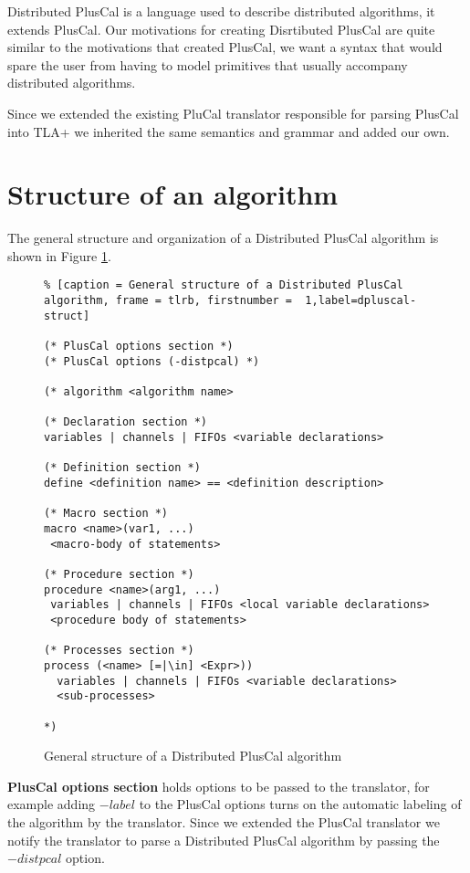 \documentclass{thesul}
\begin{document}
Distributed PlusCal is a language used to describe distributed algorithms, it extends PlusCal. 
Our motivations for creating Disrtibuted PlusCal are quite similar to the motivations that created PlusCal, we want a syntax that would spare the user from having to model primitives that usually accompany distributed algorithms.

Since we extended the existing PluCal translator responsible for parsing PlusCal into TLA+ we inherited the same semantics and grammar and added our own.

\section{Structure of an algorithm}

The general structure and organization of a Distributed PlusCal algorithm is shown in Figure \ref{dpluscal-struct}.

\FloatBarrier
\begin{figure}
\begin{lstlisting}% [caption = General structure of a Distributed PlusCal algorithm, frame = tlrb, firstnumber =  1,label=dpluscal-struct]

(* PlusCal options section *)
(* PlusCal options (-distpcal) *)

(* algorithm <algorithm name>

(* Declaration section *)
variables | channels | FIFOs <variable declarations>

(* Definition section *)
define <definition name> == <definition description>

(* Macro section *)
macro <name>(var1, ...)
 <macro-body of statements>

(* Procedure section *)
procedure <name>(arg1, ...)
 variables | channels | FIFOs <local variable declarations>
 <procedure body of statements>

(* Processes section *)
process (<name> [=|\in] <Expr>))
  variables | channels | FIFOs <variable declarations>
  <sub-processes>

*)

\end{lstlisting}
\caption{General structure of a Distributed PlusCal algorithm}
\label{dpluscal-struct}
\end{figure}
\FloatBarrier

\textbf{PlusCal options section} holds options to be passed to the translator, for example adding $-label$ to the PlusCal options turns on the automatic labeling of the algorithm by the translator. Since we extended the PlusCal translator we notify the translator to parse a Distributed PlusCal algorithm by passing the $-distpcal$ option.
\end{document}
